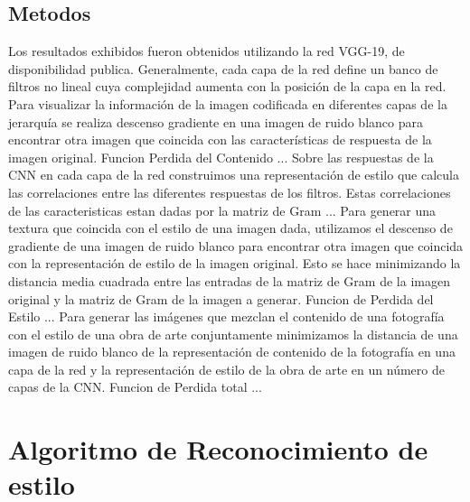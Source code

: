 \documentclass[a4paper,12pt,spanish]{book}
\begin{document}
    \subsection{Metodos}
      Los resultados exhibidos fueron obtenidos utilizando la red VGG-19, de disponibilidad publica.
      Generalmente, cada capa de la red define un banco de filtros no lineal cuya complejidad aumenta con la posición de la capa en la red.
      Para visualizar la información de la imagen codificada en diferentes capas de la jerarquía se realiza descenso gradiente en una imagen de ruido blanco 
      para encontrar otra imagen que coincida con las características de respuesta de la imagen original.
      Funcion Perdida del Contenido ...
      Sobre las respuestas de la CNN en cada capa de la red construimos una representación de estilo que calcula las correlaciones entre las diferentes respuestas de los filtros.
      Estas correlaciones de las caracteristicas estan dadas por la matriz de Gram ...
      Para generar una textura que coincida con el estilo de una imagen dada, utilizamos el descenso de gradiente de una imagen de ruido blanco para encontrar otra imagen que coincida 
      con la representación de estilo de la imagen original. Esto se hace minimizando la distancia media cuadrada entre las entradas de la matriz de Gram de la imagen 
      original y la matriz de Gram de la imagen a generar.
      Funcion de Perdida del Estilo ...
      Para generar las imágenes que mezclan el contenido de una fotografía con el estilo de una obra de arte conjuntamente minimizamos la distancia de una imagen de ruido blanco 
      de la representación de contenido de la fotografía en una capa de la red y la representación de estilo de la obra de arte en un número de capas de la CNN.
      Funcion de Perdida total ...
    
  \section{Algoritmo de Reconocimiento de estilo}
\end{document}
